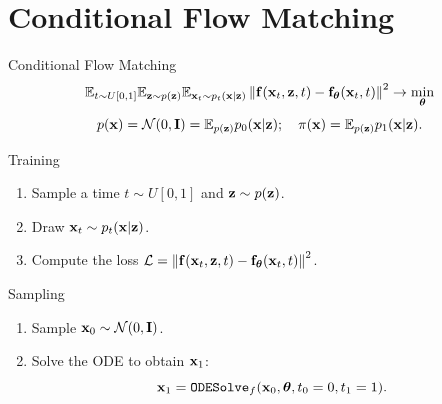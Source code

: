 \documentclass{beamer}
\begin{document}
\section{Conditional Flow Matching}
\begin{frame}{Conditional Flow Matching}
	\[
		\mathbb{E}_{t \sim U[0, 1]} \mathbb{E}_{\mathbf{z} \sim p(\mathbf{z})} \mathbb{E}_{\mathbf{x}_t \sim p_t(\mathbf{x} | \mathbf{z})}\left\| \mathbf{f}(\mathbf{x}_t, \mathbf{z}, t) - \mathbf{f}_{\boldsymbol{\theta}}(\mathbf{x}_t, t) \right\|^2 \rightarrow \min_{\boldsymbol{\theta}}
	\]
	\[
		p(\mathbf{x}) = \mathcal{N}(0, \mathbf{I}) = \mathbb{E}_{p(\mathbf{z})} p_0(\mathbf{x} | \mathbf{z}); \quad \pi(\mathbf{x}) = \mathbb{E}_{p(\mathbf{z})} p_1(\mathbf{x} | \mathbf{z}).
	\]
	\vspace{-0.3cm}
	\begin{block}{Training}
		\begin{enumerate}
			\item Sample a time $t \sim U[0, 1]$ and $\mathbf{z} \sim p(\mathbf{z})$.
			\item Draw $\mathbf{x}_t \sim p_t(\mathbf{x} | \mathbf{z})$.
			\item Compute the loss $ \mathcal{L} = \left\| \mathbf{f}(\mathbf{x}_t, \mathbf{z}, t) - \mathbf{f}_{\boldsymbol{\theta}}(\mathbf{x}_t, t) \right\|^2 $.
		\end{enumerate}
	\end{block}
	\begin{block}{Sampling}
		\begin{enumerate}
			\item Sample $\mathbf{x}_0 \sim \mathcal{N}(0, \mathbf{I})$.
			\item Solve the ODE to obtain $\mathbf{x}_1$:
			\[
				\mathbf{x}_1 = \texttt{ODESolve}_f(\mathbf{x}_0, \boldsymbol{\theta}, t_0=0, t_1=1).
			\]
		\end{enumerate}
	\end{block}
\end{frame}
\end{document}
